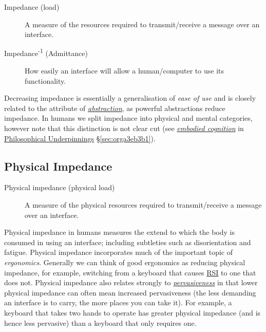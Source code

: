 \documentclass[logo,bsc,singlespacing,parskip]{infthesis}
\begin{document}
\begin{mdframed}
\begin{description}
\item[{Impedance\label{impedance} (load)}] A measure of the resources required to transmit/receive a message over an interface.

\item[{Impedance\textsuperscript{-1} (Admittance)}] How easily an interface will allow a human/computer to use its functionality.
\end{description}
\end{mdframed}

Decreasing impedance is essentially a generalisation of \emph{ease of use} and is closely related to the attribute of \emph{\hyperref[abstraction]{abstraction}}, as powerful abstractions reduce impedance.
In humans we split impedance into physical and mental categories, however note that this distinction is not clear cut (see \emph{\hyperref[org80caeb7]{embodied cognition}} in \hyperref[sec:orga3eb3b1]{Philosophical Underpinnings} \S \ref{sec:orga3eb3b1}).
\subsection{Physical Impedance}
\label{sec:org764ba19}
\medskip
\begin{mdframed}
\begin{description}
\item[{Physical impedance\label{physical impedance} (physical load)}] A measure of the physical resources required to transmit/receive a message over an interface.
\end{description}
\end{mdframed}

Physical impedance in humans measures the extend to which the body is consumed in using an interface; including subtleties such as disorientation and fatigue.
Physical impedance incorporates much of the important topic of \emph{ergonomics}.
Generally we can think of good ergonomics as reducing physical impedance, for example, switching from a keyboard that causes \hyperref[orgafdb7af]{RSI} to one that does not.
Physical impedance also relates strongly to \emph{\hyperref[pervasiveness]{pervasiveness}} in that lower physical impedance can often mean increased pervasiveness (the less demanding an interface is to carry, the more places you can take it).
For example, a keyboard that takes two hands to operate has greater physical impedance (and is hence less pervasive) than a keyboard that only requires one.
\end{document}
